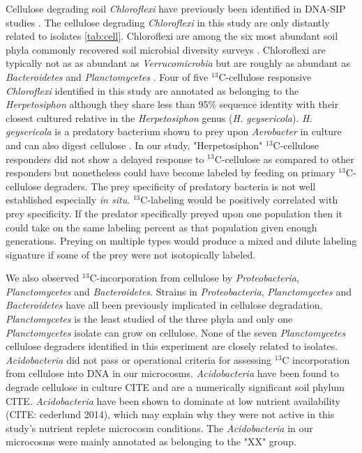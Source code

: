 Cellulose degrading soil \textit{Chloroflexi} have previously been identified
in DNA-SIP studies \citep{Schellenberger_2010}. The cellulose degrading
\textit{Chloroflexi} in this study are only distantly related to isolates
\ref{tab:cell}. Chloroflexi are among the six most abundant soil phyla commonly
recovered soil microbial diversity surveys \citep{Janssen2006}.
Chloroflexi are typically not as as abundant as \textit{Verrucomicrobia} but
are roughly as abundant as \textit{Bacteroidetes} and \textit{Planctomycetes}
\citep{Janssen2006}.  Four of five $^{13}$C-cellulose responsive
\textit{Chloroflexi} identified in this study are annotated as belonging to the
\textit{Herpetosiphon} although they share less than 95\% sequence identity with their closest cultured relative in the
\textit{Herpetosiphon} genus (\textit{H. geysericola}). \textit{H. geysericola}
is a predatory bacterium shown to prey upon \textit{Aerobacter} in culture and
can also digest cellulose \citep{Lewin1970}. In our study, "Herpetosiphon"
$^{13}$C-cellulose responders did not show a delayed response to
$^{13}$C-cellulose as compared to other responders but nonetheless could have
become labeled by feeding on primary $^{13}$C-cellulose degraders. The prey
specificity of predatory bacteria is not well established especially \textit{in
situ}. $^{13}$C-labeling would be positively correlated with prey specificity.
If the predator specifically preyed upon one population then it could take on
the same labeling percent as that population given enough generations. Preying on multiple types would
produce a mixed and dilute labeling signature if some of the prey
were not isotopically labeled.

We also observed $^{13}$C-incorporation from cellulose by
\textit{Proteobacteria}, \textit{Planctomycetes} and \textit{Bacteroidetes}. 
Strains in \textit{Proteobacteria}, \textit{Planctomycetes} and \textit{Bacteroidetes} have all been
previously implicated in cellulose degradation. \textit{Planctomycetes} is the
least studied of the three phyla and only one \textit{Planctomycetes} isolate can
grow on cellulose. None of the seven \textit{Planctomycetes} cellulose degraders
identified in this experiment are closely related to isolates.
\textit{Acidobacteria} did not pass or operational criteria for assessing
$^{13}$C incorporation from cellulose into DNA in our microcosms. 
\textit{Acidobacteria} have been found to degrade cellulose in culture CITE and
are a numerically significant soil phylum CITE. \textit{Acidobacteria} have
been shown to dominate at low nutrient availability (CITE: cederlund 2014),
which may explain why they were not active in this study's nutrient replete
microcosm conditions. The \textit{Acidobacteria} in our microcosms were mainly
annotated as belonging to the "XX" group. 

